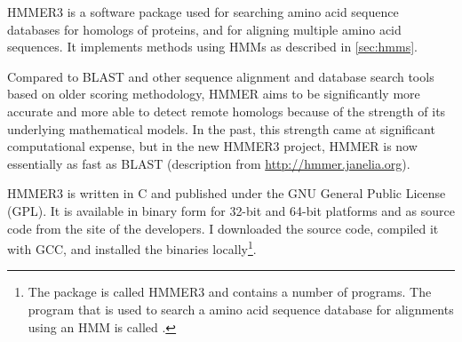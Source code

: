 HMMER3  \citep{eddy2011} is a software package used for searching amino acid
sequence databases for homologs of proteins, and for aligning multiple amino
acid sequences. It implements methods using HMMs as described in
\autoref{sec:hmms}.

Compared to BLAST and other sequence alignment and database search tools based
on older scoring methodology, HMMER aims to be significantly more accurate and
more able to detect remote homologs because of the strength of its underlying
mathematical models. In the past, this strength came at significant
computational expense, but in the new HMMER3 project, HMMER is now essentially
as fast as BLAST (description from \url{http://hmmer.janelia.org}).

HMMER3 is written in C and published under the GNU General Public License (GPL).
It is available in binary form for 32-bit and 64-bit platforms and as source
code from the site of the developers. I downloaded the source code, compiled it
with GCC, and installed the binaries locally\footnote{The package is called
HMMER3 and contains a number of programs. The program that is used to search a
amino acid sequence database for alignments using an HMM is called
.}. 


